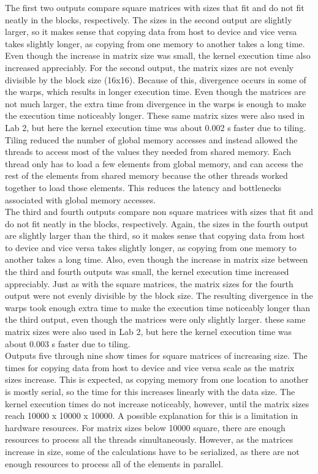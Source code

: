 \documentclass{article}
\begin{document}
The first two outputs compare square matrices with sizes that fit and do not fit neatly in the blocks, respectively. The sizes in the second output are slightly larger, so it makes sense that copying data from host to device and vice versa takes slightly longer, as copying from one memory to another takes a long time. Even though the increase in matrix size was small, the kernel execution time also increased appreciably. For the second output, the matrix sizes are not evenly divisible by the block size (16x16). Because of this, divergence occurs in some of the warps, which results in longer execution time. Even though the matrices are not much larger, the extra time from divergence in the warps is enough to make the execution time noticeably longer. These same matrix sizes were also used in Lab 2, but here the kernel execution time was about 0.002 s faster due to tiling. Tiling reduced the number of global memory accesses and instead allowed the threads to access most of the values they needed from shared memory. Each thread only has to load a few elements from global memory, and can access the rest of the elements from shared memory because the other threads worked together to load those elements. This reduces the latency and bottlenecks associated with global memory accesses. \\

The third and fourth outputs compare non square matrices with sizes that fit and do not fit neatly in the blocks, respectively. Again, the sizes in the fourth output are slightly larger than the third, so it makes sense that copying data from host to device and vice versa takes slightly longer, as copying from one memory to another takes a long time. Also, even though the increase in matrix size between the third and fourth outputs was small, the kernel execution time increased appreciably. Just as with the square matrices, the matrix sizes for the fourth output were not evenly divisible by the block size. The resulting divergence in the warps took enough extra time to make the execution time noticeably longer than the third output, even though the matrices were only slightly larger. these same matrix sizes were also used in Lab 2, but here the kernel execution time was about 0.003 s faster due to tiling.\\

Outputs five through nine show times for square matrices of increasing size. The times for copying data from host to device and vice versa scale as the matrix sizes increase. This is expected, as copying memory from one location to another is mostly serial, so the time for this increases linearly with the data size. The kernel execution times do not increase noticeably, however, until the matrix sizes reach 10000 x 10000 x 10000. A possible explanation for this is a limitation in hardware resources. For matrix sizes below 10000 square, there are enough resources to process all the threads simultaneously. However, as the matrices increase in size, some of the calculations have to be serialized, as there are not enough resources to process all of the elements in parallel.\\
\end{document}
